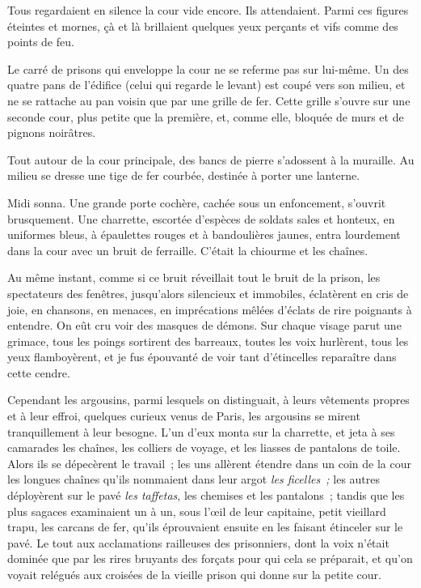 \documentclass[french,twoside]{book} %
\begin{document}
 Tous regardaient en silence la cour vide encore. Ils attendaient. Parmi ces figures éteintes et mornes, çà et là brillaient quelques yeux perçants et vifs comme des points de feu.\par
Le carré de prisons qui enveloppe la cour ne se referme pas sur lui-même. Un des quatre pans de l’édifice (celui qui regarde le levant) est coupé vers son milieu, et ne se rattache au pan voisin que par une grille de fer. Cette grille s’ouvre sur une seconde cour, plus petite que la première, et, comme elle, bloquée de murs et de pignons noirâtres.\par
Tout autour de la cour principale, des bancs de pierre s’adossent à la muraille. Au milieu se dresse une tige de fer courbée, destinée à porter une lanterne.\par
Midi sonna. Une grande porte cochère, cachée sous un enfoncement, s’ouvrit brusquement. Une charrette, escortée d’espèces de soldats sales et honteux, en uniformes bleus, à épaulettes rouges et à bandoulières jaunes, entra lourdement dans la cour avec un bruit de ferraille. C’était la chiourme et les chaînes.\par
Au même instant, comme si ce bruit réveillait tout le bruit de la prison, les spectateurs des fenêtres, jusqu’alors silencieux et immobiles, éclatèrent en cris de joie, en chansons, en menaces, en imprécations mêlées d’éclats de rire poignants à entendre. On eût cru voir des masques de démons. Sur chaque visage parut une grimace, tous les poings sortirent des barreaux, toutes les voix hurlèrent, tous les yeux flamboyèrent, et je fus épouvanté de voir tant d’étincelles reparaître dans cette cendre.\par
 Cependant les argousins, parmi lesquels on distinguait, à leurs vêtements propres et à leur effroi, quelques curieux venus de Paris, les argousins se mirent tranquillement à leur besogne. L’un d’eux monta sur la charrette, et jeta à ses camarades les chaînes, les colliers de voyage, et les liasses de pantalons de toile. Alors ils se dépecèrent le travail ; les uns allèrent étendre dans un coin de la cour les longues chaînes qu’ils nommaient dans leur argot \emph{les ficelles ;} les autres déployèrent sur le pavé \emph{les taffetas}, les chemises et les pantalons ; tandis que les plus sagaces examinaient un à un, sous l’œil de leur capitaine, petit vieillard trapu, les carcans de fer, qu’ils éprouvaient ensuite en les faisant étinceler sur le pavé. Le tout aux acclamations railleuses des prisonniers, dont la voix n’était dominée que par les rires bruyants des forçats pour qui cela se préparait, et qu’on voyait relégués aux croisées de la vieille prison qui donne sur la petite cour.\par
\end{document}
